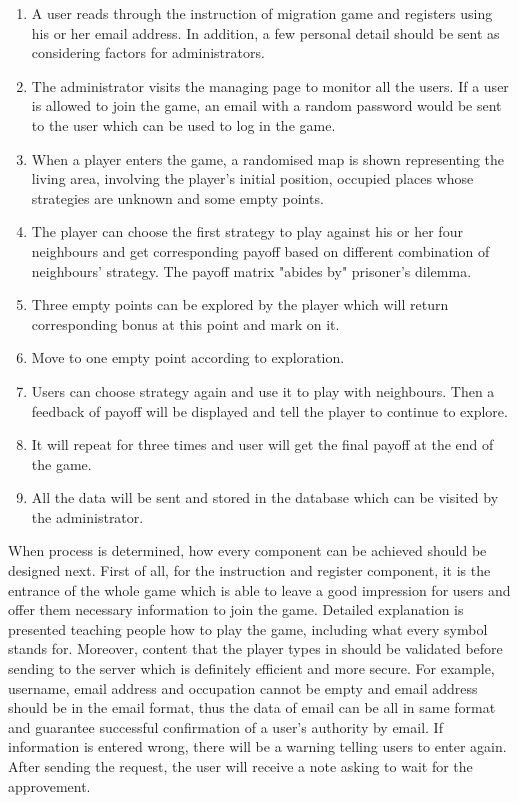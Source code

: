 \begin{enumerate}
\item A user reads through the instruction of migration game and registers using his or her email address. In addition, a few personal detail should be sent as considering factors for administrators.
\item The administrator visits the managing page to monitor all the users. If a user is allowed to join the game, an email with a random password would be sent to the user which can be used to log in the game.
\item When a player enters the game, a randomised map is shown representing the living area, involving the player's initial position, occupied places whose strategies are unknown and some empty points. 
\item The player can choose the first strategy to play against his or her four neighbours and get corresponding payoff based on different combination of neighbours' strategy. The payoff matrix "abides by" prisoner's dilemma.
\item Three empty points can be explored by the player which will return corresponding bonus at this point and mark on it.
\item Move to one empty point according to exploration.
\item Users can choose strategy again and use it to play with neighbours. Then a feedback of payoff will be displayed and tell the player to continue to explore.
\item It will repeat for three times and user will get the final payoff at the end of the game.
\item All the data will be sent and stored in the database which can be visited by the administrator.
\end{enumerate}
When process is determined, how every component can be achieved should be designed next. First of all, for the instruction and register component, it is the entrance of the whole game which is able to leave a good impression for users and offer them necessary information to join the game. Detailed explanation is presented teaching people how to play the game, including what every symbol stands for. Moreover, content that the player types in should be validated before sending to the server which is definitely efficient and more secure. For example, username, email address and occupation cannot be empty and email address should be in the email format, thus the data of email can be all in same format and guarantee successful confirmation of a user's authority by email. If information is entered wrong, there will be a warning telling users to enter again. After sending the request, the user will receive a note asking to wait for the approvement. 

